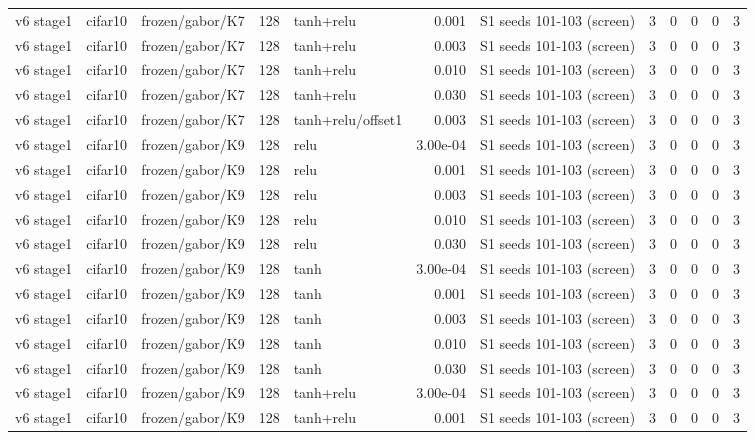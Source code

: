 \begin{table}[htbp]
{\begin{tabular}{@{}lllrlrlrrrrr@{}}
v6 stage1 & cifar10 & frozen/gabor/K7 & 128 & tanh+relu & 0.001 & S1 seeds 101-103 (screen) & 3 & 0 & 0 & 0 & 3 \\
v6 stage1 & cifar10 & frozen/gabor/K7 & 128 & tanh+relu & 0.003 & S1 seeds 101-103 (screen) & 3 & 0 & 0 & 0 & 3 \\
v6 stage1 & cifar10 & frozen/gabor/K7 & 128 & tanh+relu & 0.010 & S1 seeds 101-103 (screen) & 3 & 0 & 0 & 0 & 3 \\
v6 stage1 & cifar10 & frozen/gabor/K7 & 128 & tanh+relu & 0.030 & S1 seeds 101-103 (screen) & 3 & 0 & 0 & 0 & 3 \\
v6 stage1 & cifar10 & frozen/gabor/K7 & 128 & tanh+relu/offset1 & 0.003 & S1 seeds 101-103 (screen) & 3 & 0 & 0 & 0 & 3 \\
v6 stage1 & cifar10 & frozen/gabor/K9 & 128 & relu & 3.00e-04 & S1 seeds 101-103 (screen) & 3 & 0 & 0 & 0 & 3 \\
v6 stage1 & cifar10 & frozen/gabor/K9 & 128 & relu & 0.001 & S1 seeds 101-103 (screen) & 3 & 0 & 0 & 0 & 3 \\
v6 stage1 & cifar10 & frozen/gabor/K9 & 128 & relu & 0.003 & S1 seeds 101-103 (screen) & 3 & 0 & 0 & 0 & 3 \\
v6 stage1 & cifar10 & frozen/gabor/K9 & 128 & relu & 0.010 & S1 seeds 101-103 (screen) & 3 & 0 & 0 & 0 & 3 \\
v6 stage1 & cifar10 & frozen/gabor/K9 & 128 & relu & 0.030 & S1 seeds 101-103 (screen) & 3 & 0 & 0 & 0 & 3 \\
v6 stage1 & cifar10 & frozen/gabor/K9 & 128 & tanh & 3.00e-04 & S1 seeds 101-103 (screen) & 3 & 0 & 0 & 0 & 3 \\
v6 stage1 & cifar10 & frozen/gabor/K9 & 128 & tanh & 0.001 & S1 seeds 101-103 (screen) & 3 & 0 & 0 & 0 & 3 \\
v6 stage1 & cifar10 & frozen/gabor/K9 & 128 & tanh & 0.003 & S1 seeds 101-103 (screen) & 3 & 0 & 0 & 0 & 3 \\
v6 stage1 & cifar10 & frozen/gabor/K9 & 128 & tanh & 0.010 & S1 seeds 101-103 (screen) & 3 & 0 & 0 & 0 & 3 \\
v6 stage1 & cifar10 & frozen/gabor/K9 & 128 & tanh & 0.030 & S1 seeds 101-103 (screen) & 3 & 0 & 0 & 0 & 3 \\
v6 stage1 & cifar10 & frozen/gabor/K9 & 128 & tanh+relu & 3.00e-04 & S1 seeds 101-103 (screen) & 3 & 0 & 0 & 0 & 3 \\
v6 stage1 & cifar10 & frozen/gabor/K9 & 128 & tanh+relu & 0.001 & S1 seeds 101-103 (screen) & 3 & 0 & 0 & 0 & 3 \\

\end{tabular}}
\end{table}
